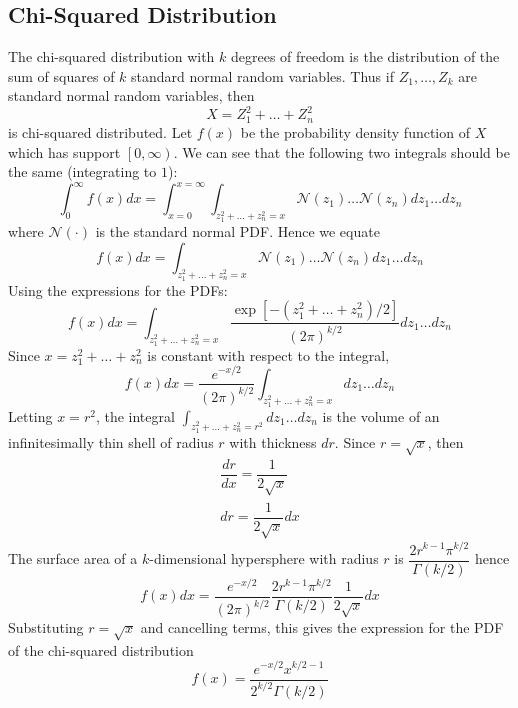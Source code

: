 \documentclass[11pt]{report} %
\begin{document}
\subsection{Chi-Squared Distribution}

The chi-squared distribution with $k$ degrees of freedom is the distribution of the sum of squares of $k$ standard normal random variables. Thus if $Z_{1}, \dots, Z_{k}$ are standard normal random variables, then
\begin{equation}
X = Z_{1}^{2} + \dots + Z_{n}^{2}
\end{equation}
is chi-squared distributed. Let $f\left(x\right)$ be the probability density function of $X$ which has support $\left[0, \infty\right)$. We can see that the following two integrals should be the same (integrating to $1$):
\begin{equation}
\int_{0}^{\infty}f\left(x\right)dx = \int_{x = 0}^{x = \infty}\int_{z_{1}^{2} + \dots + z_{n}^{2} = x}\mathcal{N}\left(z_{1}\right)\dots\mathcal{N}\left(z_{n}\right)dz_{1}\dots dz_{n}
\end{equation}
where $\mathcal{N}\left(\cdot\right)$ is the standard normal PDF. Hence we equate
\begin{equation}
f\left(x\right)dx = \int_{z_{1}^{2} + \dots + z_{n}^{2} = x}\mathcal{N}\left(z_{1}\right)\dots\mathcal{N}\left(z_{n}\right)dz_{1}\dots dz_{n}
\end{equation}
Using the expressions for the PDFs:
\begin{equation}
f\left(x\right)dx = \int_{z_{1}^{2} + \dots + z_{n}^{2} = x}\dfrac{\exp\left[-\left(z_{1}^{2} + \dots + z_{n}^{2}\right)/2\right]}{\left(2\pi\right)^{k/2}}dz_{1}\dots dz_{n}
\end{equation}
Since $x = z_{1}^{2} + \dots + z_{n}^{2}$ is constant with respect to the integral,
\begin{equation}
f\left(x\right)dx = \dfrac{e^{-x/2}}{\left(2\pi\right)^{k/2}}\int_{z_{1}^{2} + \dots + z_{n}^{2} = x}dz_{1}\dots dz_{n}
\end{equation}
Letting $x = r^{2}$, the integral $\int_{z_{1}^{2} + \dots + z_{n}^{2} = r^{2}}dz_{1}\dots dz_{n}$ is the volume of an infinitesimally thin shell of radius $r$ with thickness $dr$. Since $r = \sqrt{x}$, then
\begin{gather}
\dfrac{dr}{dx} = \dfrac{1}{2\sqrt{x}} \\
dr = \dfrac{1}{2\sqrt{x}}dx
\end{gather}
The surface area of a $k$-dimensional hypersphere with radius $r$ is $\dfrac{2r^{k-1}\pi^{k/2}}{\Gamma\left(k/2\right)}$ hence
\begin{equation}
f\left(x\right)dx = \dfrac{e^{-x/2}}{\left(2\pi\right)^{k/2}}\dfrac{2r^{k-1}\pi^{k/2}}{\Gamma\left(k/2\right)}\dfrac{1}{2\sqrt{x}}dx
\end{equation}
Substituting $r = \sqrt{x}$ and cancelling terms, this gives the expression for the PDF of the chi-squared distribution
\begin{equation}
f\left(x\right) = \dfrac{e^{-x/2}x^{k/2 - 1}}{2^{k/2}\Gamma\left(k/2\right)}
\end{equation}
\end{document}
